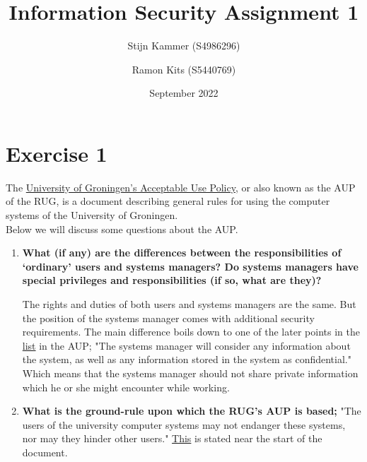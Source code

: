 \documentclass{report}
\title{Information Security Assignment 1}
\author{
    Stijn Kammer (S4986296)
    \and Ramon Kits (S5440769)
}
\date{September 2022}
\begin{document}
\maketitle

\section*{Exercise 1}
The \href{
      https://www.rug.nl/society-business/centre-for-information-technology/security/aup/
}{University of Groningen's Acceptable Use Policy},
or also known as the AUP of the RUG, is a document describing general rules for
using the computer systems of the University of Groningen.\\
Below we will discuss some questions about the AUP.

\begin{enumerate}
      \item \textbf{What (if any) are the differences between the responsibilities of `ordinary'
                  users and systems managers? Do systems managers have special privileges
                  and responsibilities (if so, what are they)?}

            The rights and duties of both users and systems managers are the same.
            But the position of the systems manager comes with additional security requirements.
            The main difference boils down to one of the later points in the
            \href{
                  https://www.rug.nl/society-business/centre-for-information-technology/security/aup/#:~:text=systems%
            }{list}
            in the AUP;
            "The systems manager will consider any information about the system, as well as any
            information stored in the system as confidential." Which means that the systems manager
            should not share private information which he or she might encounter while working.

      \item \textbf{What is the ground-rule upon which the RUG's AUP is based;}
            "The users of the university computer systems may not endanger these systems, nor may they hinder other users."
            \href{
                  https://www.rug.nl/society-business/centre-for-information-technology/security/aup/#:~:text=the%
            }{This} is stated near the start of the document.


\end{enumerate}
\end{document}
